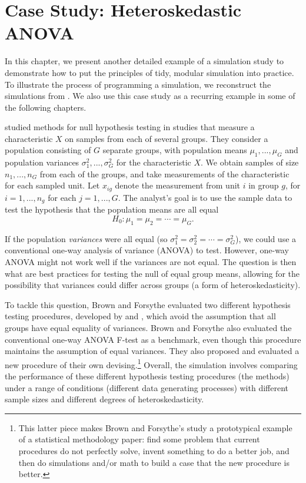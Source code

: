 \documentclass[
]{book}
\begin{document}
\chapter{Case Study: Heteroskedastic ANOVA}\label{case-ANOVA}

In this chapter, we present another detailed example of a simulation study to demonstrate how to put the principles of tidy, modular simulation into practice.
To illustrate the process of programming a simulation, we reconstruct the simulations from \citet{brown1974SmallSampleBehavior}.
We also use this case study as a recurring example in some of the following chapters.

\citet{brown1974SmallSampleBehavior} studied methods for null hypothesis testing in studies that measure a characteristic \(X\) on samples from each of several groups. They consider a population consisting of \(G\) separate groups, with population means \(\mu_1,...,\mu_G\) and population variances \(\sigma_1^2,...,\sigma_G^2\) for the characteristic \(X\).
We obtain samples of size \(n_1,...,n_G\) from each of the groups, and take measurements of the characteristic for each sampled unit.
Let \(x_{ig}\) denote the measurement from unit \(i\) in group \(g\), for \(i = 1,...,n_g\) for each \(j = 1,..., G\).
The analyst's goal is to use the sample data to test the hypothesis that the population means are all equal
\[
H_0: \mu_1 = \mu_2 = \cdots = \mu_G.
\]

If the population \emph{variances} were all equal (so \(\sigma_1^2 = \sigma_2^2 = \cdots = \sigma_G^2\)), we could use a conventional one-way analysis of variance (ANOVA) to test.
However, one-way ANOVA might not work well if the variances are not equal.
The question is then what are best practices for testing the null of equal group means, allowing for the possibility that variances could differ across groups (a form of heteroskedasticity).

To tackle this question, Brown and Forsythe evaluated two different hypothesis testing procedures, developed by \citet{james1951ComparisonSeveralGroups} and \citet{welch1951ComparisonSeveralMean}, which avoid the assumption that all groups have equal equality of variances.
Brown and Forsythe also evaluated the conventional one-way ANOVA F-test as a benchmark, even though this procedure maintains the assumption of equal variances.
They also proposed and evaluated a new procedure of their own devising.\footnote{This latter piece makes Brown and Forsythe's study a prototypical example of a statistical methodology paper: find some problem that current procedures do not perfectly solve, invent something to do a better job, and then do simulations and/or math to build a case that the new procedure is better.}
Overall, the simulation involves comparing the performance of these different hypothesis testing procedures (the methods) under a range of conditions (different data generating processes) with different sample sizes and different degrees of heteroskedasticity.
\end{document}

